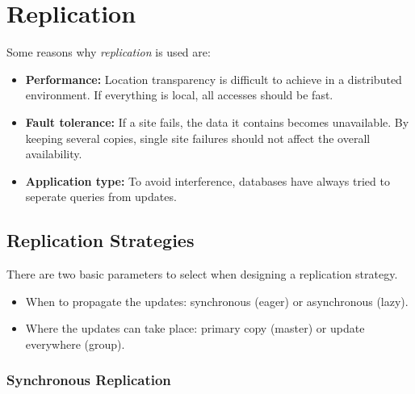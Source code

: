 

\section{Replication}

Some reasons why \emph{replication} is used are:
\begin{itemize}
\item \textbf{Performance:} Location transparency is difficult to achieve in a distributed environment. If everything is local, all accesses should be fast.
\item \textbf{Fault tolerance:} If a site fails, the data it contains becomes unavailable. By keeping several copies, single site failures should not affect the overall availability.
\item \textbf{Application type:} To avoid interference, databases have always tried to seperate queries from updates.
\end{itemize}




\subsection{Replication Strategies}

There are two basic parameters to select when designing a replication strategy.
\begin{itemize}
\item When to propagate the updates: synchronous (eager) or asynchronous (lazy).
\item Where the updates can take place: primary copy (master) or update everywhere (group).
\end{itemize}




\subsubsection{Synchronous Replication}

